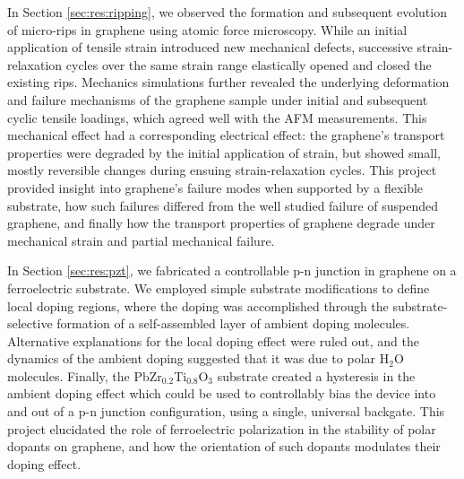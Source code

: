 \documentclass[edeposit,fullpage,draftthesis]{uiucthesis2009}
\begin{document}
            In Section \ref{sec:res:ripping}, we observed the formation and subsequent evolution of
            micro-rips in graphene using atomic force microscopy. While an initial
            application of tensile strain introduced new mechanical defects, successive
            strain-relaxation cycles over the same strain range elastically opened and closed
            the existing rips. Mechanics simulations further revealed the underlying
            deformation and failure mechanisms of the graphene sample under initial and
            subsequent cyclic tensile loadings, which agreed well with the AFM measurements.
            This mechanical effect had a corresponding electrical effect: the graphene's
            transport properties were degraded by the initial application of strain, but
            showed small, mostly reversible changes during ensuing strain-relaxation cycles.
            This project provided insight into graphene's failure modes when supported by a
            flexible substrate, how such failures differed from the well studied failure of
            suspended graphene, and finally how the transport properties of graphene degrade
            under mechanical strain and partial mechanical failure. 
            
            In Section \ref{sec:res:pzt}, we fabricated a controllable p-n junction in graphene on a ferroelectric 
            substrate. We employed simple substrate modifications to define local doping regions, where 
            the doping was accomplished through the substrate-selective formation of a self-assembled 
            layer of ambient doping molecules. Alternative explanations for the local doping effect 
            were ruled out, and the dynamics of the ambient doping suggested that it was due to polar 
            H$_2$O molecules. Finally, the PbZr$_{0.2}$Ti$_{0.8}$O$_3$ substrate created a hysteresis 
            in the ambient doping effect which could be used to controllably bias the device into and 
            out of a p-n junction configuration, using a single, universal backgate. This project
            elucidated the role of ferroelectric polarization in the stability of polar
            dopants on graphene, and how the orientation of such dopants modulates their doping effect.
\end{document}
